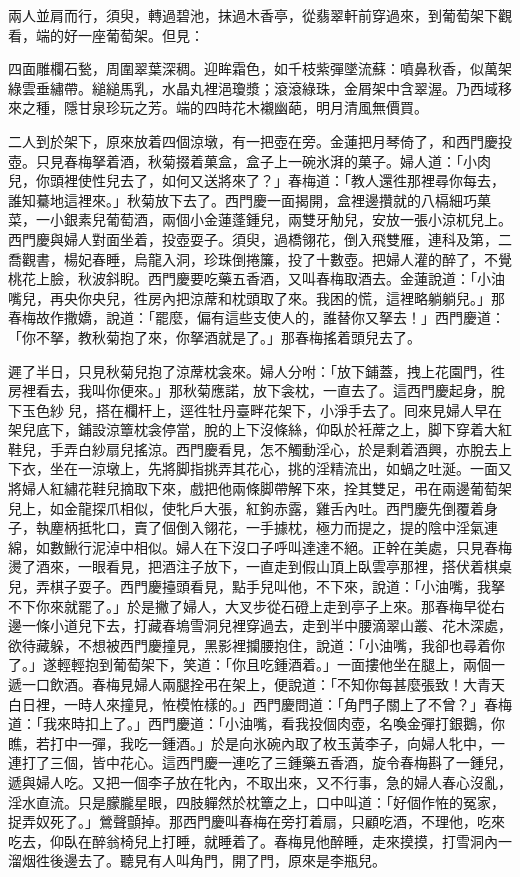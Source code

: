 兩人並肩而行，須臾，轉過碧池，抹過木香亭，從翡翠軒前穿過來，到葡萄架下觀看，端的好一座葡萄架。但見：

\begin{myquote} 
四面雕欄石甃，周圍翠葉深稠。迎眸霜色，如千枝紫彈墜流蘇：噴鼻秋香，似萬架綠雲垂繡帶。縋縋馬乳，水晶丸裡浥瓊漿；滾滾綠珠，金屑架中含翠渥。乃西域移來之種，隱甘泉珍玩之芳。端的四時花木襯幽葩，明月清風無價買。
\end{myquote}

二人到於架下，原來放着四個涼墩，有一把壺在旁。金蓮把月琴倚了，{}和西門慶投壺。只見春梅拏着酒，秋菊掇着菓盒，盒子上一碗氷湃的菓子。婦人道：「小肉兒，你頭裡使性兒去了，如何又送將來了？」春梅道：「教人還徃那裡尋你每去，誰知驀地這裡來。」秋菊放下去了。西門慶一面揭開，盒裡邊攢就的八槅細巧菓菜，一小銀素兒葡萄酒，兩個小金蓮蓬鍾兒，兩雙牙觔兒，安放一張小涼杌兒上。西門慶與婦人對面坐着，投壺耍子。須臾，過橋翎花，倒入飛雙雁，連科及第，二喬觀書，楊妃春睡，烏龍入洞，珍珠倒捲簾，投了十數壺。把婦人灌的醉了，不覺桃花上臉，秋波斜睨。西門慶要吃藥五香酒，又叫春梅取酒去。金蓮說道：「小油嘴兒，再央你央兒，{}徃房內把涼蓆和枕頭取了來。我困的慌，這裡略躺躺兒。」那春梅故作撒嬌，說道：「罷麼，偏有這些支使人的，誰替你又拏去！」西門慶道：「你不拏，{}教秋菊抱了來，你拏酒就是了。」那春梅搖着頭兒去了。

遲了半日，只見秋菊兒抱了涼蓆枕衾來。婦人分咐：「放下鋪蓋，拽上花園門，徃房裡看去，我叫你便來。」那秋菊應諾，放下衾枕，一直去了。這西門慶起身，脫下玉色紗𧜽兒，搭在欄杆上，逕徃牡丹臺畔花架下，小淨手去了。囘來見婦人早在架兒底下，鋪設涼簟枕衾停當，脫的上下沒條絲，仰臥於衽蓆之上，脚下穿着大紅鞋兒，手弄白紗扇兒搖涼。西門慶看見，怎不觸動淫心，於是剩着酒興，亦脫去上下衣，坐在一涼墩上，先將脚指挑弄其花心，挑的淫精流出，如蝸之吐涎。一面又將婦人紅繡花鞋兒摘取下來，戲把他兩條脚帶解下來，拴其雙足，弔在兩邊葡萄架兒上，如金龍探爪相似，使牝戶大張，紅鉤赤露，雞舌內吐。西門慶先倒覆着身子，執麈柄抵牝口，賣了個倒入翎花，一手據枕，極力而提之，提的陰中淫氣連綿，如數鰍行泥淖中相似。婦人在下沒口子呼叫達達不絕。正幹在美處，只見春梅燙了酒來，一眼看見，把酒注子放下，一直走到假山頂上臥雲亭那裡，搭伏着棋桌兒，弄棋子耍子。西門慶擡頭看見，點手兒叫他，不下來，說道：「小油嘴，我拏不下你來就罷了。」於是撇了婦人，大叉步從石磴上走到亭子上來。那春梅早從右邊一條小道兒下去，打藏春塢雪洞兒裡穿過去，走到半中腰滴翠山叢、花木深處，欲待藏躲，{}不想被西門慶撞見，黑影裡攔腰抱住，說道：「小油嘴，我卻也尋着你了。」遂輕輕抱到葡萄架下，笑道：「你且吃鍾酒着。」一面摟他坐在腿上，兩個一遞一口飲酒。春梅見婦人兩腿拴弔在架上，便說道：「不知你每甚麼張致！大青天白日裡，一時人來撞見，恠模恠樣的。」西門慶問道：「角門子關上了不曾？」春梅道：「我來時扣上了。」西門慶道：「小油嘴，看我投個肉壺，名喚金彈打銀鵝，你瞧，若打中一彈，我吃一鍾酒。」於是向氷碗內取了枚玉黃李子，向婦人牝中，一連打了三個，皆中花心。{}這西門慶一連吃了三鍾藥五香酒，旋令春梅斟了一鍾兒，遞與婦人吃。又把一個李子放在牝內，不取出來，又不行事，急的婦人春心沒亂，淫水直流。只是朦朧星眼，四肢軃然於枕簟之上，{}口中叫道：「好個作恠的冤家，捉弄奴死了。」鶯聲顫掉。那西門慶叫春梅在旁打着扇，只顧吃酒，不理他，{}吃來吃去，仰臥在醉翁椅兒上打睡，就睡着了。{}春梅見他醉睡，走來摸摸，打雪洞內一溜烟徃後邊去了。聽見有人叫角門，開了門，原來是李瓶兒。{}

